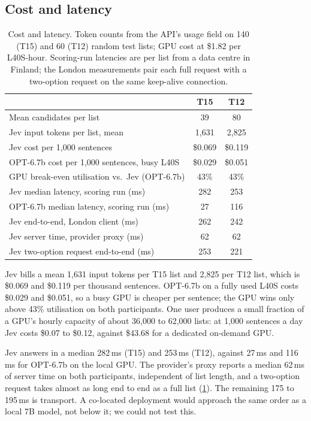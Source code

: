 \documentclass[11pt]{article}
\begin{document}
\subsection{Cost and latency}
\label{sec:cost}

\begin{table}[t]
\centering\scriptsize
\setlength{\tabcolsep}{3pt}
\begin{tabular}{lcc}
\toprule
& T15 & T12 \\
\midrule
Mean candidates per list & 39 & 80 \\
Jev input tokens per list, mean & 1,631 & 2,825 \\
Jev cost per 1,000 sentences & \$0.069 & \$0.119 \\
OPT-6.7b cost per 1,000 sentences, busy L40S & \$0.029 & \$0.051 \\
GPU break-even utilisation vs.\ Jev (OPT-6.7b) & 43\% & 43\% \\
Jev median latency, scoring run (ms) & 282 & 253 \\
OPT-6.7b median latency, scoring run (ms) & 27 & 116 \\
Jev end-to-end, London client (ms) & 262 & 242 \\
Jev server time, provider proxy (ms) & 62 & 62 \\
Jev two-option request end-to-end (ms) & 253 & 221 \\
\bottomrule
\end{tabular}
\caption{Cost and latency. Token counts from the API's usage field on 140 (T15) and 60 (T12) random
test lists; GPU cost at \$1.82 per L40S-hour. Scoring-run latencies are per list from a data centre
in Finland; the London measurements pair each full request with a two-option request on the same
keep-alive connection.}
\label{tab:latency}
\end{table}

Jev bills a mean 1,631 input tokens per T15 list and 2,825 per T12 list, which is \$0.069 and \$0.119
per thousand sentences. OPT-6.7b on a fully used L40S costs \$0.029 and \$0.051, so a busy GPU is
cheaper per sentence; the GPU wins only above 43\% utilisation on both participants. One user
produces a small fraction of a GPU's hourly capacity of about 36,000 to 62,000 lists: at 1,000
sentences a day Jev costs \$0.07 to \$0.12, against \$43.68 for a dedicated on-demand GPU.

Jev answers in a median 282\,ms (T15) and 253\,ms (T12), against 27\,ms and 116\,ms for OPT-6.7b on
the local GPU. The provider's proxy reports a median 62\,ms of server time on both participants,
independent of list length, and a two-option request takes almost as long end to end as a full list
(\cref{tab:latency}). The remaining 175 to 195\,ms is transport. A co-located deployment would
approach the same order as a local 7B model, not below it; we could not test this.
\end{document}
